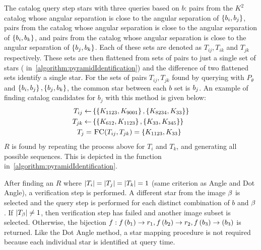 The catalog query step stars with three queries based on $b$: pairs from the $K^2$ catalog whose angular separation
is close to the angular separation of $\left\{ b_i, b_j \right\}$, pairs from the catalog whose angular separation
is close to the angular separation of $\left\{ b_i, b_k \right\}$, and pairs from the catalog whose angular separation is
close to the angular separation of $\left\{  b_j, b_k  \right\}$.
Each of these sets are denoted as $T_{ij}, T_{ik}$ and $T_{jk}$ respectively.
These sets are then flattened from sets of pairs to just a single set of stars (
in~\autoref{algorithm:pyramidIdentification}) and the difference of two flattened sets identify a single star.
For the sets of pairs $T_{ij}, T_{jk}$ found by querying with $P_\theta$ and $\left\{ b_i, b_j \right\},
\left\{ b_j, b_k \right\}$, the common star between each $b$ set is $b_j$.
An example of finding catalog candidates for $b_j$ with this method is given below:
\begin{equation}
    \begin{aligned}
        T_{ij} \gets& \set{ \set{\vv{K_{1123}}, \vv{K_{9001}}}, \set{\vv{K_{8234}}, \vv{K_{33}}} } \\
        T_{jk} \gets& \set{ \set{\vv{K_{612}}, \vv{K_{1123}}}, \set{\vv{K_{33}}, \vv{K_{345}}} } \\
        T_j =& \  \Call{FC}{T_{ij}, T_{jk}} = \set{\vv{K_{1123}}, \vv{K_{33}}}
    \end{aligned}
\end{equation}
$R$ is found by repeating the process above for $T_i$ and $T_k$, and generating all possible sequences.
This is depicted in the  function in~\autoref{algorithm:pyramidIdentification}.

After finding an $R$ where $\left| T_i \right| = \left| T_j \right| = \left| T_k \right| = 1$ (same criterion as Angle and Dot Angle), a
verification step is performed.
A different star from the image $\beta$ is selected and the query step is performed for each distinct combination
of $b$ and $\beta$.
If $\left| T_\beta \right| \neq 1$, then verification step has failed and another image subset is selected.
Otherwise, the bijection $f : f\left(b_1\right) \rightarrow r_1, f\left(b_2\right)
\rightarrow r_2, f\left(b_3\right) \rightarrow(b_3)$ is returned.
Like the Dot Angle method, a star mapping procedure is not required because each individual star is identified
at query time.

